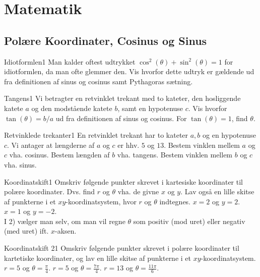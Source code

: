 \chapter{Matematik}
\section*{Polære Koordinater, Cosinus og Sinus}
\begin{opgave}{Idiotformlen}{1}
Man kalder oftest udtrykket $\cos^2(\theta)+\sin^2(\theta)=1$ for idiotformlen, da man ofte glemmer den. Vis hvorfor dette udtryk er gældende ud fra definitionen af sinus og cosinus samt Pythagoras sætning.
\end{opgave}
\begin{opgave}{Tangens}{1}
Vi betragter en retvinklet trekant med to kateter, den hosliggende katete $a$ og den modstående katete $b$, samt en hypotenuse $c$.
\opg Vis hvorfor $\tan(\theta)=b/a$ ud fra definitionen af sinus og cosinus.
\opg For $\tan(\theta)=1$, find $\theta$.
\end{opgave}
\begin{opgave}{Retvinklede trekanter}{1}
En retvinklet trekant har to kateter $a,b$ og en hypotenuse $c$. Vi antager at længderne af $a$ og $c$ er hhv. $5$ og $13$.
\opg Bestem vinklen mellem $a$ og $c$ vha. cosinus.
\opg Bestem længden af $b$ vha. tangens.
\opg Bestem vinklen mellem $b$ og $c$ vha. sinus.
\end{opgave}
\begin{opgave}{Koordinatskift}{1}
Omskriv følgende punkter skrevet i kartesiske koordinater til polære koordinater. Dvs. find $r$ og $\theta$ vha. de givne $x$ og $y$. Lav også en lille skitse af punkterne i et $xy$-koordinatsystem, hvor $r$ og $\theta$ indtegnes.
\opg $x=2$ og $y=2$.
\opg $x=1$ og $y=-2$.\\
I 2) vælger man selv, om man vil regne $\theta$ som positiv (mod uret) eller negativ (med uret) ift. $x$-aksen.
\end{opgave}
\begin{opgave}{Koordinatskift 2}{1}
Omskriv følgende punkter skrevet i polære koordinater til kartetiske koordinater, og lav en lille skitse af punkterne i et $xy$-koordinatsystem.
\opg $r=5$ og $\theta=\frac{\pi}{4}$.
\opg $r=5$ og $\theta=\frac{7\pi}{4}$.
\opg $r=13$ og $\theta=\frac{11\pi}{6}$.
\end{opgave}
\newpage
